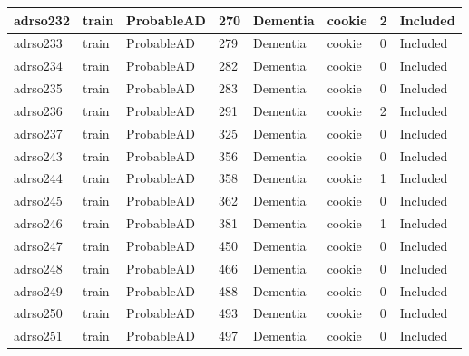 \begin{center}
\begin{longtable}{|l|l|l|l|l|l|l|l|}
adrso232  & train            & ProbableAD   & 270         & Dementia             & cookie          & 2                & Included      \\ \hline
adrso233  & train            & ProbableAD   & 279         & Dementia             & cookie          & 0                & Included      \\ \hline
adrso234  & train            & ProbableAD   & 282         & Dementia             & cookie          & 0                & Included      \\ \hline
adrso235  & train            & ProbableAD   & 283         & Dementia             & cookie          & 0                & Included      \\ \hline
adrso236  & train            & ProbableAD   & 291         & Dementia             & cookie          & 2                & Included      \\ \hline
adrso237  & train            & ProbableAD   & 325         & Dementia             & cookie          & 0                & Included      \\ \hline
adrso243  & train            & ProbableAD   & 356         & Dementia             & cookie          & 0                & Included      \\ \hline
adrso244  & train            & ProbableAD   & 358         & Dementia             & cookie          & 1                & Included      \\ \hline
adrso245  & train            & ProbableAD   & 362         & Dementia             & cookie          & 0                & Included      \\ \hline
adrso246  & train            & ProbableAD   & 381         & Dementia             & cookie          & 1                & Included      \\ \hline
adrso247  & train            & ProbableAD   & 450         & Dementia             & cookie          & 0                & Included      \\ \hline
adrso248  & train            & ProbableAD   & 466         & Dementia             & cookie          & 0                & Included      \\ \hline
adrso249  & train            & ProbableAD   & 488         & Dementia             & cookie          & 0                & Included      \\ \hline
adrso250  & train            & ProbableAD   & 493         & Dementia             & cookie          & 0                & Included      \\ \hline
adrso251  & train            & ProbableAD   & 497         & Dementia             & cookie          & 0                & Included      \\ \hline

\end{longtable}
\end{center}
